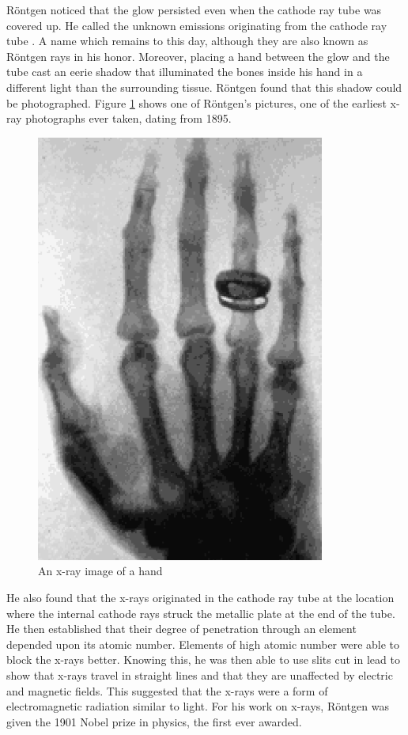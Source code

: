 \noindent Röntgen noticed that the glow persisted even when the cathode ray tube was covered up. He called the unknown emissions originating from the cathode ray tube . A name which remains to this day, although they are also known as Röntgen rays in his honor. Moreover, placing a hand between the glow and the tube cast an eerie shadow that illuminated the bones inside his hand in a different light than the surrounding tissue. Röntgen found that this shadow could be photographed. Figure \ref{fig:XR2} shows one of Röntgen’s pictures, one of the earliest x-ray photographs ever taken, dating from 1895. 

\begin{figure}[H]
    \centering
    \includegraphics[scale = 0.8]{Images/XR2.PNG}
    \caption{An x-ray image of a hand}
    \label{fig:XR2}
\end{figure}

\noindent He also found that the x-rays originated in the cathode ray tube at the location where the internal cathode rays struck the metallic plate at the end of the tube. He then established that their degree of penetration through an element depended upon its atomic number. Elements of high atomic number were able to block the x-rays better. Knowing this, he was then able to use slits cut in lead to show that x-rays travel in straight lines and that they are unaffected by electric and magnetic fields. This suggested that the x-rays were a form of electromagnetic radiation similar to light. For his work on x-rays, Röntgen was given the 1901 Nobel prize in physics, the first ever awarded.

